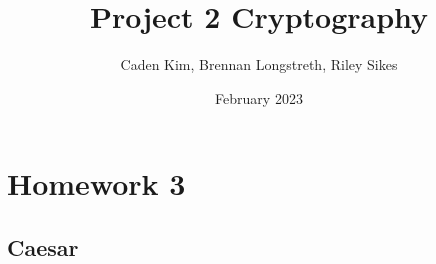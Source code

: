 \documentclass{article}
\title{Project 2 Cryptography}
\author{Caden Kim, Brennan Longstreth, Riley Sikes }
\date{February 2023}
\begin{document}
\maketitle

\section{Homework 3}

\subsection{Caesar}
\end{document}
